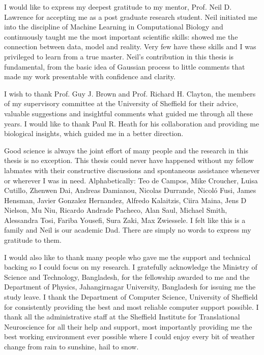 
\begin{acknowledgements}      


I would like to express my deepest gratitude to my mentor, Prof. Neil D. Lawrence for accepting me as a post graduate research student. Neil initiated me into the discipline of Machine Learning in Computational Biology and continuously taught me the most important scientific skills: showed me the connection between data, model and reality. Very few have these skills and I was privileged to learn from a true master. Neil’s contribution in this thesis is fundamental, from the basic idea of Gaussian process to little comments that made my work presentable with confidence and clarity.

I wish to thank Prof. Guy J. Brown and Prof. Richard H. Clayton, the members of my supervisory committee at the University of Sheffield for their advice, valuable suggestions and insightful comments what guided me through all these years. I would like to thank Paul R. Heath for his collaboration and providing me biological insights, which guided me in a better direction.

Good science is always the joint effort of many people and the research in this thesis is no exception. This thesis could never have happened without my fellow labmates with their constructive discussions and spontaneous assistance whenever or wherever I was in need. Alphabetically: Teo de Campos, Mike Croucher, Luisa Cutillo, Zhenwen Dai, Andreas Damianou, Nicolas Durrande, Nicol{\'o} Fusi, James Hensman, Javier Gonzalez Hernandez, Alfredo Kalaitzis, Ciira Maina, Jens D Nielson, Mu Niu, Ricardo Andrade Pacheco, Alan Saul, Michael Smith, Alessandra Tosi, Fariba Yousefi, Sura Zaki, Max Zwiessele. I felt like this is a family and Neil is our academic Dad. There are simply no words to express my gratitude to them.

I would also like to thank many people who gave me the support and technical backing so I could focus on my research. I gratefully acknowledge the Ministry of Science and Technology, Bangladesh, for the fellowship awarded to me and  the Department of Physics, Jahangirnagar University, Bangladesh for issuing me the study leave. I thank the Department of Computer Science, University of Sheffield for consistently providing the best and most reliable computer support possible. I thank all the administrative staff at the Sheffield Institute for Translational Neuroscience for all their help and support, most importantly providing me the best working environment ever possible where I could enjoy every bit of weather change from rain to sunshine, hail to snow.


\end{acknowledgements}
